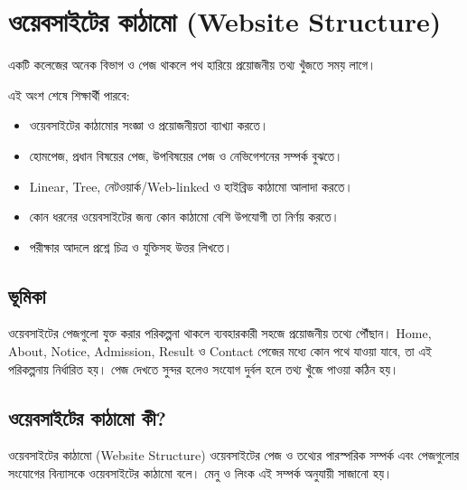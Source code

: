 \section{ওয়েবসাইটের কাঠামো (Website Structure)}

একটি কলেজের অনেক বিভাগ ও পেজ থাকলে পথ হারিয়ে প্রয়োজনীয় তথ্য খুঁজতে সময় লাগে।



\begin{learningbox}
এই অংশ শেষে শিক্ষার্থী পারবে:
\begin{itemize}
\item ওয়েবসাইটের কাঠামোর সংজ্ঞা ও প্রয়োজনীয়তা ব্যাখ্যা করতে।
\item হোমপেজ, প্রধান বিষয়ের পেজ, উপবিষয়ের পেজ ও নেভিগেশনের সম্পর্ক বুঝতে।
\item Linear, Tree, নেটওয়ার্ক/Web-linked ও হাইব্রিড কাঠামো আলাদা করতে।
\item কোন ধরনের ওয়েবসাইটের জন্য কোন কাঠামো বেশি উপযোগী তা নির্ণয় করতে।
\item পরীক্ষার আদলে প্রশ্নে চিত্র ও যুক্তিসহ উত্তর লিখতে।
\end{itemize}
\end{learningbox}

\subsection{ভূমিকা}
ওয়েবসাইটের পেজগুলো যুক্ত করার পরিকল্পনা থাকলে ব্যবহারকারী সহজে প্রয়োজনীয় তথ্যে পৌঁছান। Home, About, Notice, Admission, Result ও Contact পেজের মধ্যে কোন পথে যাওয়া যাবে, তা এই পরিকল্পনায় নির্ধারিত হয়। পেজ দেখতে সুন্দর হলেও সংযোগ দুর্বল হলে তথ্য খুঁজে পাওয়া কঠিন হয়।

\subsection{ওয়েবসাইটের কাঠামো কী?}

\begin{definitionbox}{ওয়েবসাইটের কাঠামো (Website Structure)}
ওয়েবসাইটের পেজ ও তথ্যের পারস্পরিক সম্পর্ক এবং পেজগুলোর সংযোগের বিন্যাসকে ওয়েবসাইটের কাঠামো বলে। মেনু ও লিংক এই সম্পর্ক অনুযায়ী সাজানো হয়।
\end{definitionbox}



